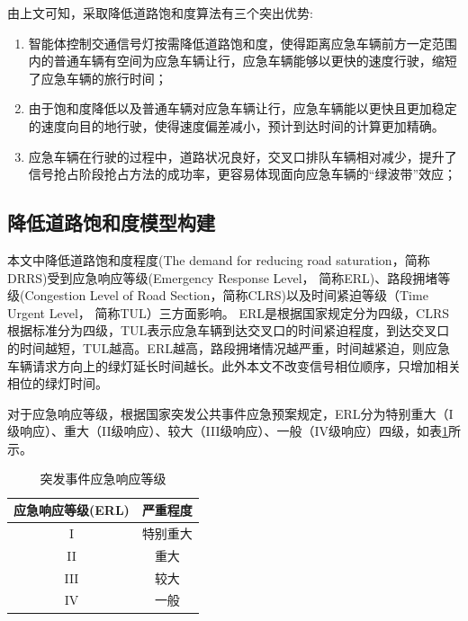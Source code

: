由上文可知，采取降低道路饱和度算法有三个突出优势:
\begin{enumerate}
	\item 智能体控制交通信号灯按需降低道路饱和度，使得距离应急车辆前方一定范围内的普通车辆有空间为应急车辆让行，应急车辆能够以更快的速度行驶，缩短了应急车辆的旅行时间；
	\item 由于饱和度降低以及普通车辆对应急车辆让行，应急车辆能以更快且更加稳定的速度向目的地行驶，使得速度偏差减小，预计到达时间的计算更加精确。
	\item 应急车辆在行驶的过程中，道路状况良好，交叉口排队车辆相对减少，提升了信号抢占阶段抢占方法的成功率，更容易体现面向应急车辆的“绿波带”效应；
	
\end{enumerate}

\subsection{降低道路饱和度模型构建}

本文中降低道路饱和度程度(The demand for reducing road saturation，简称DRRS)受到应急响应等级(Emergency Response Level， 简称ERL)、路段拥堵等级(Congestion Level of Road Section，简称CLRS)以及时间紧迫等级（Time Urgent Level， 简称TUL）三方面影响。
ERL是根据国家规定\cite{erl_2019}分为四级，CLRS根据标准\cite{GA_T_115_2020}分为四级，TUL表示应急车辆到达交叉口的时间紧迫程度，到达交叉口的时间越短，TUL越高。ERL越高，路段拥堵情况越严重，时间越紧迫，则应急车辆请求方向上的绿灯延长时间越长。此外本文不改变信号相位顺序，只增加相关相位的绿灯时间。



对于应急响应等级，根据国家突发公共事件应急预案规定\cite{erl_2019}，ERL分为特别重大（I级响应）、重大（II级响应）、较大（III级响应）、一般（IV级响应）四级，如表\ref{table:ERL}所示。
\begin{table}[H]
	\centering
	\caption{突发事件应急响应等级}
	\label{table:ERL}
	\begin{tabular}{|c|c|}
		\hline
		应急响应等级(ERL) & 严重程度 \\ \hline
		I & 特别重大 \\ \hline
		II & 重大 \\ \hline
		III & 较大 \\ \hline
		IV & 一般 \\ \hline
	\end{tabular}
\end{table}

